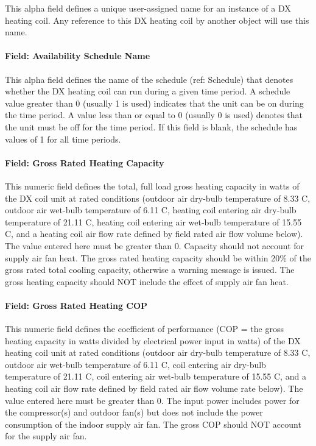 This alpha field defines a unique user-assigned name for an instance of a DX heating coil. Any reference to this DX heating coil by another object will use this name.

\paragraph{Field: Availability Schedule Name}\label{field-availability-schedule-name-10-000}

This alpha field defines the name of the schedule (ref: Schedule) that denotes whether the DX heating coil can run during a given time period. A schedule value greater than 0 (usually 1 is used) indicates that the unit can be on during the time period. A value less than or equal to 0 (usually 0 is used) denotes that the unit must be off for the time period. If this field is blank, the schedule has values of 1 for all time periods.

\paragraph{Field: Gross Rated Heating Capacity}\label{field-gross-rated-heating-capacity-2}

This numeric field defines the total, full load gross heating capacity in watts of the DX coil unit at rated conditions (outdoor air dry-bulb temperature of 8.33 C, outdoor air wet-bulb temperature of 6.11 C, heating coil entering air dry-bulb temperature of 21.11 C, heating coil entering air wet-bulb temperature of 15.55 C, and a heating coil air flow rate defined by field rated air flow volume below). The value entered here must be greater than 0. Capacity should not account for supply air fan heat. The gross rated heating capacity should be within 20\% of the gross rated total cooling capacity, otherwise a warning message is issued. The gross heating capacity should NOT include the effect of supply air fan heat.

\paragraph{Field: Gross Rated Heating COP}\label{field-gross-rated-heating-cop}

This numeric field defines the coefficient of performance (COP = the gross heating capacity in watts divided by electrical power input in watts) of the DX heating coil unit at rated conditions (outdoor air dry-bulb temperature of 8.33 C, outdoor air wet-bulb temperature of 6.11 C, coil entering air dry-bulb temperature of 21.11 C, coil entering air wet-bulb temperature of 15.55 C, and a heating coil air flow rate defined by field rated air flow volume rate below). The value entered here must be greater than 0. The input power includes power for the compressor(s) and outdoor fan(s) but does not include the power consumption of the indoor supply air fan. The gross COP should NOT account for the supply air fan.

